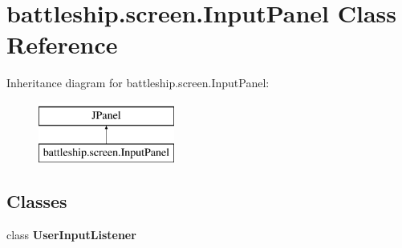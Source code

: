 \hypertarget{classbattleship_1_1screen_1_1InputPanel}{}\section{battleship.\+screen.\+Input\+Panel Class Reference}
\label{classbattleship_1_1screen_1_1InputPanel}
Inheritance diagram for battleship.\+screen.\+Input\+Panel\+:\begin{figure}[H]
\begin{center}
\leavevmode
\includegraphics[height=2.000000cm]{classbattleship_1_1screen_1_1InputPanel}
\end{center}
\end{figure}
\subsection*{Classes}
\begin{DoxyCompactItemize}
\item 
class {\bfseries User\+Input\+Listener}
\end{DoxyCompactItemize}
